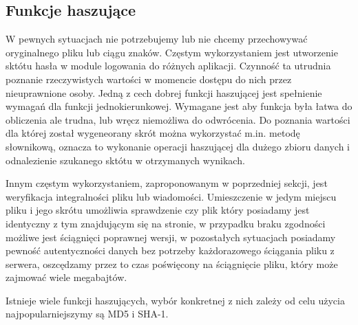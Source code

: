\subsection{Funkcje haszujące}
\label{sec:hashfunction}

W pewnych sytuacjach nie potrzebujemy lub nie chcemy przechowywać oryginalnego pliku lub ciągu znaków. Częstym wykorzystaniem jest utworzenie sktótu hasła w module logowania do różnych aplikacji. Czynność ta utrudnia poznanie rzeczywistych wartości w momencie dostępu do nich przez nieuprawnione osoby. Jedną z cech dobrej funkcji haszującej jest
spełnienie wymagań dla funkcji jednokierunkowej. Wymagane jest aby funkcja była łatwa do obliczenia ale trudna, lub wręcz niemożliwa do odwrócenia.
Do poznania wartości dla której został wygeneorany skrót można wykorzystać m.in. metodę słownikową, oznacza to wykonanie operacji haszującej dla dużego zbioru danych i odnalezienie szukanego sktótu w otrzymanych wynikach.

Innym częstym wykorzystaniem, zaproponowanym w poprzedniej sekcji, jest weryfikacja integralności pliku lub wiadomości. Umieszczenie w jedym miejscu pliku i jego skrótu umożliwia sprawdzenie czy plik który posiadamy jest identyczny z tym znajdującym się na stronie, w przypadku braku zgodności możliwe jest ściągnięci poprawnej wersji, w pozostałych sytuacjach posiadamy pewność autentyczności danych bez potrzeby każdorazowego ściągania pliku z serwera, oszcędzamy przez to czas poświęcony na ściągnięcie pliku, który może zajmować wiele megabajtów.

Istnieje wiele funkcji haszujących, wybór konkretnej z nich zależy od celu użycia najpopularniejszymy są MD5 i SHA-1.

